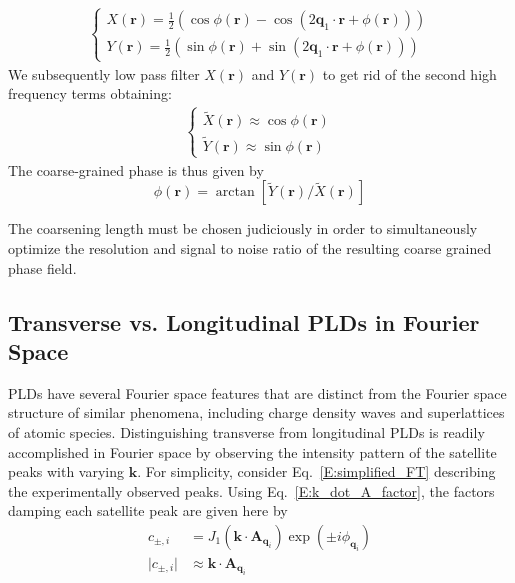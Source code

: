\documentclass[12pt]{article}
\begin{document}
\begin{equation*}
\begin{aligned}
\begin{cases}
X(\mathbf{r}) = \frac{1}{2}\left(\cos\phi(\mathbf{r}) - \cos(2\mathbf{q}_1\cdot\mathbf{r}+\phi(\mathbf{r}))\right) \\
Y(\mathbf{r}) = \frac{1}{2}\left(\sin\phi(\mathbf{r}) + \sin(2\mathbf{q}_1\cdot\mathbf{r}+\phi(\mathbf{r}))\right)
\end{cases}
\end{aligned}
\end{equation*}
We subsequently low pass filter $X(\mathbf{r})$ and $Y(\mathbf{r})$ to get rid of the second high frequency terms obtaining: 
\begin{equation*}
\begin{aligned}
\begin{cases}
\tilde{X}(\mathbf{r}) \approx \cos\phi(\mathbf{r})  \\
\tilde{Y}(\mathbf{r}) \approx \sin\phi(\mathbf{r}) 
\end{cases}
\end{aligned}
\end{equation*}
The coarse-grained phase is thus given by 
\begin{equation*}
\phi(\mathbf{r}) = \arctan[\tilde{Y}(\mathbf{r})/ \tilde{X}(\mathbf{r})]
\end{equation*}

The coarsening length must be chosen judiciously in order to simultaneously optimize the resolution and signal to noise ratio of the resulting coarse grained phase field. 



\subsection*{Transverse vs. Longitudinal PLDs in Fourier Space}
PLDs have several Fourier space features that are distinct from the Fourier space structure of similar phenomena, including charge density waves and superlattices of atomic species.
Distinguishing transverse from longitudinal PLDs is readily accomplished in Fourier space by observing the intensity pattern of the satellite peaks with varying $\mathbf{k}$.
For simplicity, consider Eq.~\ref{E:simplified_FT} describing the experimentally observed peaks.
Using Eq.~\ref{E:k_dot_A_factor}, the factors damping each satellite peak are given here by
\begin{align*}
	c_{{\pm},i} &= J_1\left(\mathbf{k}\cdot\mathbf{A}_{\mathbf{q}_i}\right)\exp\left(\pm i\phi_{\mathbf{q}_i}\right)\\
    \lvert c_{{\pm},i}\rvert &\approx \mathbf{k}\cdot\mathbf{A}_{\mathbf{q}_i}
\end{align*}
\end{document}
